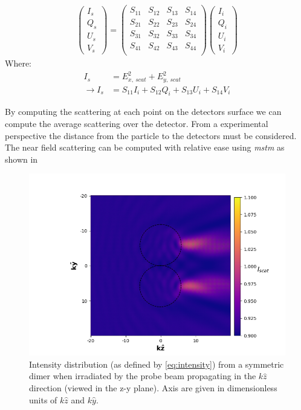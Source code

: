 \begin{align}
	\begin{pmatrix}
		I_s \\ Q_s \\ U_s \\ V_s
	\end{pmatrix} = 
	\begin{pmatrix}
		S_{11} & S_{12} & S_{13} & S_{14} \\
		S_{21} & S_{22} & S_{23} & S_{24} \\
		S_{31} & S_{32} & S_{33} & S_{34} \\
		S_{41} & S_{42} & S_{43} & S_{44} \\
	\end{pmatrix}
	\begin{pmatrix}
		I_i \\ Q_i \\ U_i \\ V_i
	\end{pmatrix}
\end{align}
Where:
\begin{align}
	I_s &= E_{x,\ scat}^2+E_{y,\ scat}^2  \label{eq:intensity} 
	\\
	\rightarrow I_s &= S_{11}I_i+S_{12}Q_i+S_{13}U_i+S_{14}V_i
\end{align}

By computing the scattering at each point on the detectors surface 
we can compute the average scattering over the detector. From a
experimental perspective the distance from the particle to the 
detectors must be considered. The near field scattering can be 
computed with relative ease using \textit{mstm} as shown in 
\begin{figure}[h!]
	\centering
	\includegraphics[width=\linewidth]{near_field_intensity_side_profile.png}
	\caption{Intensity distribution (as defined by \eqref{eq:intensity}) 
		from a symmetric dimer when irradiated by the probe beam 
		propagating in the $k\hat{z}$ direction (viewed in the 
		z-y plane). Axis are given in dimensionless units of 
		$k\hat{z}$ and $k\hat{y}$.}
	\label{fig:nf_scattering}
\end{figure}

